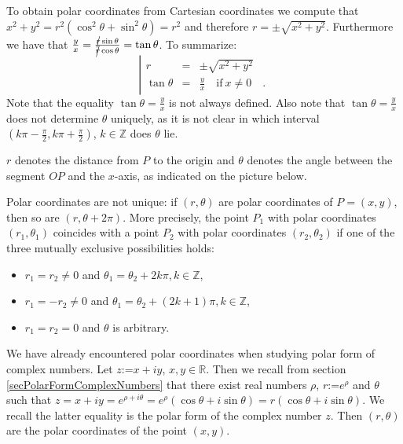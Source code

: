 \documentclass[12pt]{book}
\renewcommand{\optionalDisplay}[1]{}
\newcommand{\eqdef}{\textbf{:=}}
\begin{document}
To obtain polar coordinates from Cartesian coordinates we compute that $x^2+y^2= r^2(\cos^2 \theta+\sin^2\theta)=r^2$ and therefore $r=\pm\sqrt{x^2+y^2}$. Furthermore we have that $\frac{y}{x}= \frac{\cancel{r}\sin \theta}{\cancel{r}\cos \theta}=\tan \theta$. To summarize:
\[
\left|\begin{array}{rcl}
r&=&\pm\sqrt{x^2+y^2}\\
\tan\theta&=&\frac{y}{x} \quad \mathrm{if~}x\neq 0 \quad .
\end{array}\right.
\]
Note that the equality $\tan \theta = \frac{y}{x}$ is not always defined. Also note that  $\tan \theta=\frac{y}{x}$ does not determine $\theta$ uniquely, as it is not clear in which interval $(k\pi -\frac{\pi}{2}, k\pi+\frac{\pi}{2})$, $k\in \mathbb Z$ does $\theta$ lie.

$r$ denotes the distance from $P$ to the origin and $\theta$ denotes the angle between the segment $OP$ and the $x$-axis, as indicated on the picture below.

\optionalDisplay{
\psset{xunit=1cm,yunit=1cm}
\begin{pspicture*}(-1.5,-1.5)(5,4)
\psline[linecolor=gray](-1.5,0)(2.5,0) %
\psline[linecolor=gray](0,-1.5)(0,2.5) %
\parametricplot[linecolor=red]{0}{60}{t cos 0.25 mul t 1000 div 1 add mul t sin 0.25 mul t 1000 div 1 add mul}
\parametricplot[linecolor=red, arrows=->]{0}{780}{t cos 0.55 mul t 1000 div 1 add mul t sin 0.55 mul t 1000 div 1 add mul}
\psline(0,0)(2,  3.464)
\rput(2,  3.464){$\bullet$}
\rput[lt](2,  3.264){$P= (r\cos \theta, r\sin \theta)$}
\rput(0.35,  0.25){$\theta$}
\end{pspicture*}
} %

Polar coordinates are not unique: if $(r, \theta)$ are polar coordinates of $P=(x,y)$, then so are $(r, \theta+2\pi)$. More precisely, the point $P_1$ with polar coordinates $(r_1, \theta_1)$ coincides with a point $P_2$ with polar coordinates $(r_2, \theta_2)$ if one of the three mutually exclusive possibilities holds:
\begin{itemize}
\item $r_1=r_2\neq 0$ and $\theta_1=\theta_2+2k\pi, k\in \mathbb Z $,
\item $r_1=-r_2\neq 0$ and $\theta_1=\theta_2+(2k+1)\pi, k\in \mathbb Z$,
\item $r_1=r_2=0 $ and $\theta$ is arbitrary.
\end{itemize}




We have already encountered polar coordinates when studying polar form of complex numbers. Let $z\eqdef x+iy$, $x,y\in \mathbb R$. Then we recall from section \ref{secPolarFormComplexNumbers} that there exist real numbers $\rho$, $r\eqdef e^\rho$ and $\theta$ such that $z=x+iy= e^{\rho+i\theta}= e^\rho(\cos \theta+i\sin \theta)= r(\cos \theta + i\sin \theta)$. We recall the latter equality is the polar form of the complex number $z$. Then $(r, \theta)$ are the polar coordinates of the point $(x,y)$.
\end{document}
